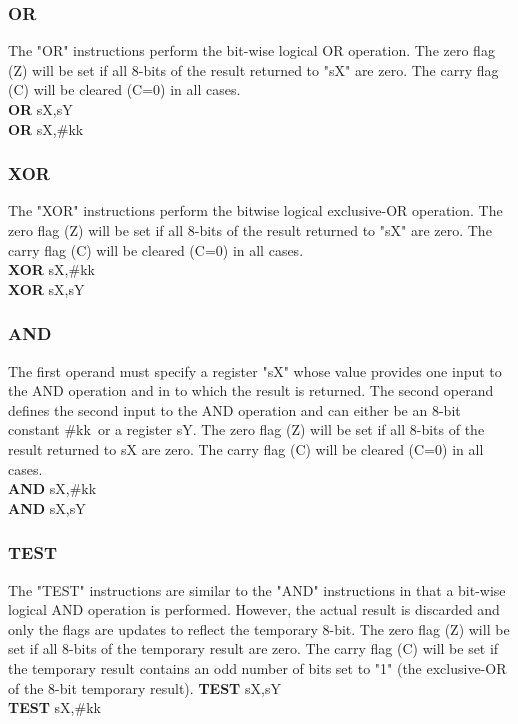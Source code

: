 {        \subsubsection{OR}
            The "OR" instructions perform the bit-wise logical OR operation.
            The zero flag (Z) will be set if all 8-bits of the result returned to "sX" are zero.
            The carry flag (C) will be cleared (C=0) in all cases.\\
                \textbf{OR} sX,sY\\
                \textbf{OR} sX,\#kk\\

        \subsubsection{XOR}
            The "XOR" instructions perform the bit\-wise logical exclusive-OR operation.
                The zero flag (Z) will be set if all 8-bits of the result returned to "sX" are zero.
            The carry flag (C) will be cleared (C=0) in all cases.\\
                \textbf{XOR} sX,\#kk\\
                \textbf{XOR} sX,sY\\

        \subsubsection{AND}
            The first operand must specify a register "sX" whose value provides one input to the AND operation and in to which the result is returned.
            The second operand defines the second input to the AND operation and can either be an 8-bit constant \#kk\ or a register sY.
            The zero flag (Z) will be set if all 8-bits of the result returned to sX are zero.
            The carry flag (C) will be cleared (C=0) in all cases.\\
                \textbf{AND} sX,\#kk\\
                \textbf{AND} sX,sY\\

        \subsubsection{TEST}
            The "TEST" instructions are similar to the "AND" instructions in that a bit-wise logical AND operation is performed. However, the actual result is discarded and
            only the flags are updates to reflect the temporary 8-bit. The zero flag (Z) will be set if all 8-bits of the temporary result are zero.
            The carry flag (C) will be set if the temporary result contains an odd number of bits set to "1" (the exclusive-OR of the 8-bit temporary result).
                \textbf{TEST} sX,sY\\
                \textbf{TEST} sX,\#kk\\
}

